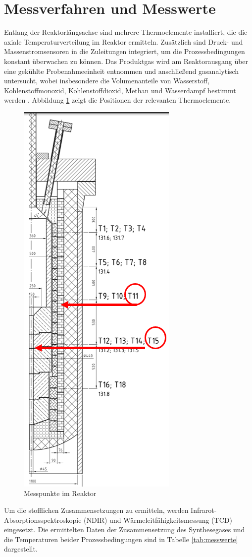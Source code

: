     \section{Messverfahren und Messwerte}
        Entlang der Reaktorlängsachse sind mehrere Thermoelemente installiert, die die axiale Temperaturverteilung im Reaktor ermitteln. Zusätzlich sind Druck- und Massenstromsensoren in die Zuleitungen integriert, um die Prozessbedingungen konstant überwachen zu können. Das Produktgas wird am Reaktorausgang über eine gekühlte Probenahmeeinheit entnommen und anschließend gasanalytisch untersucht, wobei insbesondere die Volumenanteile von Wasserstoff, Kohlenstoffmonoxid, Kohlenstoffdioxid, Methan und Wasserdampf bestimmt werden \cite{RICHTER2015110}. Abbildung \ref{fig:erweiterungen_messpunkte} zeigt die Positionen der relevanten Thermoelemente. 
        \begin{figure}[H]
            \centering
            \includegraphics[width=0.2\linewidth]{img/Erweiterungen/Messpunkte.png}
            \caption{Messpunkte im Reaktor \cite{gonzales}}
            \label{fig:erweiterungen_messpunkte}
        \end{figure}
        Um die stofflichen Zusammensetzungen zu ermitteln, werden Infrarot-Absorptions\-spek\-troskopie (NDIR) und Wärmeleitfähigkeitsmessung (TCD) eingesetzt. Die ermittelten Daten der Zusammensetzung des Synthesegases und die Temperaturen beider Prozessbedingungen sind in Tabelle \ref{tab:messwerte} dargestellt. 
